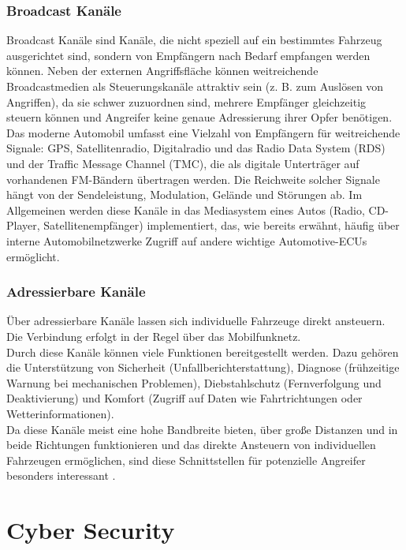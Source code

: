\subsubsection{Broadcast Kanäle}
Broadcast Kanäle sind Kanäle, die nicht speziell auf ein bestimmtes Fahrzeug ausgerichtet sind, sondern von Empfängern nach Bedarf empfangen werden können. Neben der externen Angriffsfläche können weitreichende Broadcastmedien als Steuerungskanäle attraktiv sein (z. B. zum Auslösen von Angriffen), da sie schwer zuzuordnen sind, mehrere Empfänger gleichzeitig steuern können und Angreifer keine genaue Adressierung ihrer Opfer benötigen.
Das moderne Automobil umfasst eine Vielzahl von Empfängern für weitreichende Signale: \ac{GPS}, Satellitenradio, Digitalradio und das Radio Data System (RDS) und der Traffic Message Channel (TMC), die als digitale Unterträger auf vorhandenen FM-Bändern übertragen werden. Die Reichweite solcher Signale hängt von der Sendeleistung, Modulation, Gelände und Störungen ab. Im Allgemeinen werden diese Kanäle in das Mediasystem eines Autos (Radio, CD-Player, Satellitenempfänger) implementiert, das, wie bereits erwähnt, häufig über interne Automobilnetzwerke Zugriff auf andere wichtige Automotive-ECUs ermöglicht. \cite[4\psq]{Checkoway.2011}

\subsubsection{Adressierbare Kanäle}
Über adressierbare Kanäle lassen sich individuelle Fahrzeuge direkt ansteuern. Die Verbindung erfolgt in der Regel über das Mobilfunknetz.\\
Durch diese Kanäle können viele Funktionen bereitgestellt werden. Dazu gehören die Unterstützung von Sicherheit (Unfallberichterstattung), Diagnose (frühzeitige Warnung bei mechanischen Problemen), Diebstahlschutz (Fernverfolgung und Deaktivierung) und Komfort (Zugriff auf Daten wie Fahrtrichtungen oder Wetterinformationen). \cite[5]{Checkoway.2011} \\
Da diese Kanäle meist eine hohe Bandbreite bieten, über große Distanzen und in beide Richtungen funktionieren und das direkte Ansteuern von individuellen Fahrzeugen ermöglichen, sind diese Schnittstellen für potenzielle Angreifer besonders interessant \cite[5]{Checkoway.2011}.


\section{Cyber Security}
